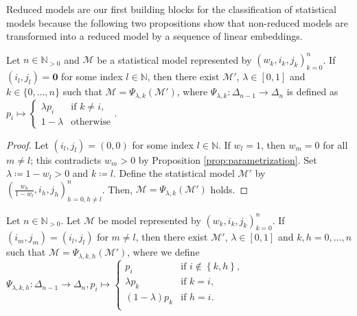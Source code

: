 Reduced models are our first building blocks for the classification of statistical models because the following two propositions show that non-reduced models are transformed into a reduced model by a sequence of linear embeddings.

\begin{proposition}\label{prop:linear-embedding-1}
    Let \( n \in \mathbb{N}_{>0} \) and \( \mathcal{M} \) be a statistical model represented by \( (w_k, i_k, j_k)_{k=0}^n \). If \( (i_l, j_l) = \mathbf{0} \) for some index \( l \in \mathbb{N} \), then there exist \( \mathcal{M}' \), \( \lambda \in [0,1] \) and \( k \in \{ 0, \dots, n \} \) such that \( \mathcal{M} = \Psi_{\lambda,k}(\mathcal{M}') \), where \( \Psi_{\lambda, k}: \Delta_{n-1} \to \Delta_n \) is defined as \(  p_i \mapsto \begin{cases}
        \lambda p_i & \text{if } k \neq i, \\
        1-\lambda & \text{otherwise}
    \end{cases} \).
\end{proposition}

\begin{proof}
    Let \( (i_l, j_l) = (0,0) \) for some index \( l \in \mathbb{N} \). If \( w_l = 1 \), then \( w_m = 0 \) for all \( m \neq l \); this contradicts \( w_m > 0 \) by Proposition \ref{prop:parametrization}. Set \( \lambda \coloneqq 1 - w_l > 0 \) and \( k \coloneqq l \). Define the statistical model \( \mathcal{M}' \) by \( \left(\frac{w_h}{1-w_l}, i_h, j_h\right)^n_{h=0, h \neq l} \).
    Then, \( \mathcal{M} = \Psi_{\lambda,k}(\mathcal{M}') \) holds.
\end{proof}

\begin{proposition}\label{prop:linear-embedding-2}
    Let \( n \in \mathbb{N}_{>0} \).
    Let \( \mathcal{M} \) be model represented by \( (w_k, i_k, j_k)_{k=0}^n \). If \( (i_m, j_m) = (i_l, j_l)  \) for \( m \neq l \), then there exist \( \mathcal{M}' \), \( \lambda \in [0,1] \) and \( k,h = 0, \dots, n \) such that \( \mathcal{M} = \Psi_{\lambda,k,h}(\mathcal{M}') \), 
    where we define \( \Psi_{\lambda, k,h}: \Delta_{n-1} \to \Delta_n,  p_i \mapsto \begin{cases}
         p_i & \text{if } i \notin \left\{ k,h \right\}, \\
        \lambda p_k & \text{if } k = i, \\
        (1-\lambda) p_k & \text{if } h = i. \\
    \end{cases} \)
\end{proposition}

